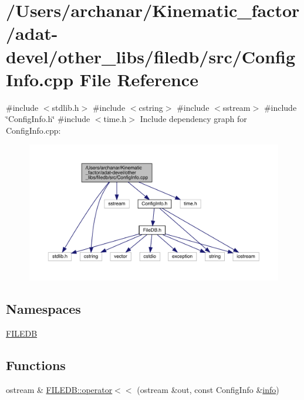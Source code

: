 \hypertarget{adat-devel_2other__libs_2filedb_2src_2ConfigInfo_8cpp}{}\section{/\+Users/archanar/\+Kinematic\+\_\+factor/adat-\/devel/other\+\_\+libs/filedb/src/\+Config\+Info.cpp File Reference}
\label{adat-devel_2other__libs_2filedb_2src_2ConfigInfo_8cpp}
{\ttfamily \#include $<$stdlib.\+h$>$}\newline
{\ttfamily \#include $<$cstring$>$}\newline
{\ttfamily \#include $<$sstream$>$}\newline
{\ttfamily \#include \char`\"{}Config\+Info.\+h\char`\"{}}\newline
{\ttfamily \#include $<$time.\+h$>$}\newline
Include dependency graph for Config\+Info.\+cpp\+:
\nopagebreak
\begin{figure}[H]
\begin{center}
\leavevmode
\includegraphics[width=350pt]{d5/ddb/adat-devel_2other__libs_2filedb_2src_2ConfigInfo_8cpp__incl}
\end{center}
\end{figure}
\subsection*{Namespaces}
\begin{DoxyCompactItemize}
\item 
 \mbox{\hyperlink{namespaceFILEDB}{F\+I\+L\+E\+DB}}
\end{DoxyCompactItemize}
\subsection*{Functions}
\begin{DoxyCompactItemize}
\item 
ostream \& \mbox{\hyperlink{namespaceFILEDB_a81be1da26a44e7de301f9b93d784ce3f}{F\+I\+L\+E\+D\+B\+::operator$<$$<$}} (ostream \&out, const Config\+Info \&\mbox{\hyperlink{structinfo}{info}})
\end{DoxyCompactItemize}
